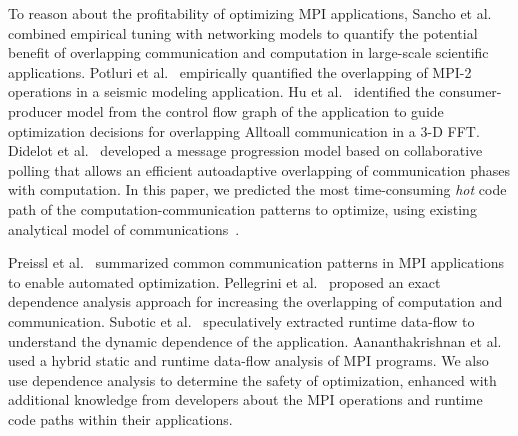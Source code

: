 To reason about the profitability of optimizing MPI applications,
 Sancho et al.~\cite{sancho:sc06} combined empirical tuning with networking models
    to quantify the potential benefit of overlapping communication and computation in large-scale scientific applications.
  Potluri et al.~\cite{potluri:ics10} empirically quantified the overlapping of MPI-2 operations in a seismic modeling application.
  Hu et al.~\cite{hu:npc08,song:ppopp14} identified the consumer-producer model from the control flow graph of the application to guide optimization decisions  for overlapping Alltoall communication in a 3-D FFT.
Didelot et al.~\cite{didelot:imc14,didelot:eurompi12} developed a message progression model based on collaborative polling that allows an efficient autoadaptive overlapping of communication phases with computation.
In this paper, we predicted the most time-consuming \emph{hot} code path of the computation-communication patterns to optimize, using existing analytical model of communications~\cite{loggp}.


Preissl et al.~\cite{preissl:tms10} summarized common communication patterns in MPI applications to enable automated optimization.
Pellegrini et al.~\cite{pellegrini:eurompi12} proposed an exact dependence analysis approach for increasing the overlapping of computation and communication.
Subotic et al.~\cite{subotic:hipeac08} speculatively extracted runtime data-flow to understand the dynamic dependence of the application.
Aananthakrishnan et al.~\cite{aananthakrishnan:ics13} used a hybrid  static and runtime data-flow analysis of MPI programs.
We also use dependence analysis to determine the safety of optimization, enhanced with additional knowledge from developers
about the MPI operations and runtime code paths within their applications.

